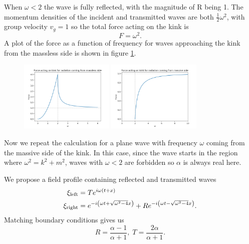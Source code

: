 \documentclass[11pt, oneside]{article}  	%
\numberwithin{equation}{section}
\begin{document}
When $\omega<2$ the wave is fully reflected, with the magnitude of R being 1. The momentum densities of the incident and transmitted waves are both $\frac{1}{2}\omega^2$, with group velocity $v_g=1$ so the total force acting on the kink is 
\begin{equation}
F = \omega^2.
\end{equation}
A plot of the force as a function of frequency for waves approaching the kink from the massless side is shown in figure \ref{force_left}.\par
\begin{figure}
\centering
\includegraphics[width=0.4\textwidth]{force_left.png}
\includegraphics[width=0.4\textwidth]{force_right.png}
 \label{force_left}
\end{figure}
Now we repeat the calculation for a plane wave with frequency $\omega$ coming from the massive side of the kink. In this case, since the wave starts in the region where $\omega^2 = k^2 + m^2$, waves with $\omega < 2$ are forbidden so $\alpha$ is always real here. \par
We propose a field profile containing reflected and transmitted waves
\begin{align}
\xi_\textup{left} &= T e^{i\omega (t+x)}\\
\xi_\textup{right} &= e^{-i\left( \omega t + \sqrt{\omega^2-4} x \right )} + Re^{-i\left( \omega t - \sqrt{\omega^2-4} x \right )} .
\end{align}
Matching boundary conditions gives us
\begin{equation}
R = \frac{\alpha-1}{\alpha+1},\; T = \frac{2\alpha}{\alpha+1}.
\end{equation}
\end{document}
